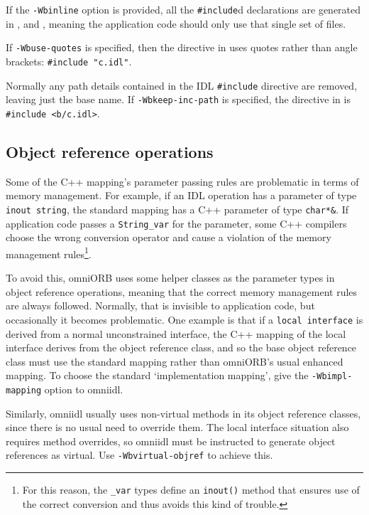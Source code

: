 \documentclass[11pt,oneside,a4paper]{book}
\newcommand{\type}[1]{\texttt{#1}}
\newcommand{\code}[1]{\texttt{#1}}
\newcommand{\op}[1]{\texttt{#1()}}
\newcommand{\cmdline}[1]{\texttt{#1}}
\begin{document}
If the \cmdline{-Wbinline} option is provided, all the
\code{\#include}d declarations are generated in ,
 and , meaning the application code
should only use that single set of files.

If \cmdline{-Wbuse-quotes} is specified, then the directive in
 uses quotes rather than angle brackets:
\code{\#include "c.idl"}.

Normally any path details contained in the IDL \code{\#include}
directive are removed, leaving just the base name. If
\cmdline{-Wbkeep-inc-path} is specified, the directive in
 is \code{\#include <b/c.idl>}.



\subsection{Object reference operations}

Some of the C++ mapping's parameter passing rules are problematic in
terms of memory management. For example, if an IDL operation has a
parameter of type \type{inout string}, the standard mapping has a C++
parameter of type \type{char*\&}. If application code passes a
\type{String\_var} for the parameter, some C++ compilers choose the
wrong conversion operator and cause a violation of the memory
management rules\footnote{For this reason, the \type{\_var} types
  define an \op{inout} method that ensures use of the correct
  conversion and thus avoids this kind of trouble.}.

To avoid this, omniORB uses some helper classes as the parameter types
in object reference operations, meaning that the correct memory
management rules are always followed. Normally, that is invisible to
application code, but occasionally it becomes problematic. One example
is that if a \type{local interface} is derived from a normal
unconstrained interface, the C++ mapping of the local interface
derives from the object reference class, and so the base object
reference class must use the standard mapping rather than omniORB's
usual enhanced mapping. To choose the standard `implementation
mapping', give the \cmdline{-Wbimpl-mapping} option to omniidl.

Similarly, omniidl usually uses non-virtual methods in its object
reference classes, since there is no usual need to override them. The
local interface situation also requires method overrides, so omniidl
must be instructed to generate object references as virtual. Use
\cmdline{-Wbvirtual-objref} to achieve this.
\end{document}
